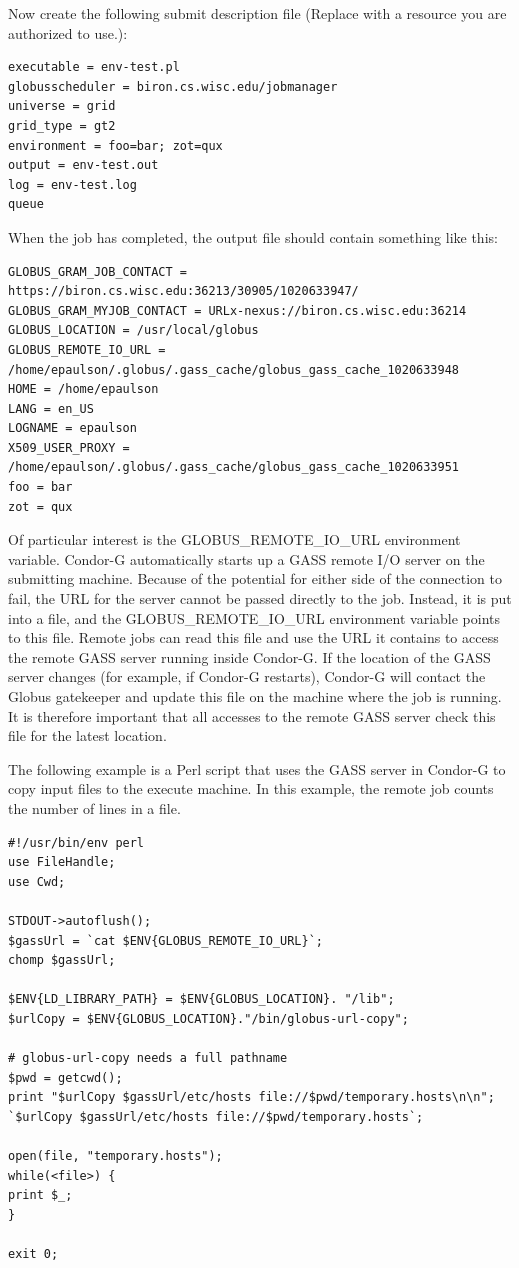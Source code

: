 Now create the following submit description file
(Replace  with a resource
you are authorized to use.):

\footnotesize
\begin{verbatim}
executable = env-test.pl
globusscheduler = biron.cs.wisc.edu/jobmanager
universe = grid
grid_type = gt2
environment = foo=bar; zot=qux
output = env-test.out
log = env-test.log
queue
\end{verbatim}
\normalsize

When the job has completed, the output file 
should contain something like this:

\footnotesize
\begin{verbatim}
GLOBUS_GRAM_JOB_CONTACT = https://biron.cs.wisc.edu:36213/30905/1020633947/
GLOBUS_GRAM_MYJOB_CONTACT = URLx-nexus://biron.cs.wisc.edu:36214
GLOBUS_LOCATION = /usr/local/globus
GLOBUS_REMOTE_IO_URL = /home/epaulson/.globus/.gass_cache/globus_gass_cache_1020633948
HOME = /home/epaulson
LANG = en_US
LOGNAME = epaulson
X509_USER_PROXY = /home/epaulson/.globus/.gass_cache/globus_gass_cache_1020633951
foo = bar
zot = qux
\end{verbatim}
\normalsize


Of particular interest is the GLOBUS\_REMOTE\_IO\_URL environment variable.
Condor-G automatically starts up a GASS remote I/O
server on the submitting machine.
Because of the potential for either side of the connection to fail,
the URL for the server cannot be passed directly to the job.
Instead, it is put into a file, and the GLOBUS\_REMOTE\_IO\_URL
environment variable points to this file. 
Remote jobs can read this file and use the URL it contains
to access the remote GASS server running inside Condor-G.
If the location
of the GASS server changes (for example, if Condor-G restarts),
Condor-G will contact the Globus gatekeeper and update this file on
the machine where the job is running.
It is therefore important that all accesses to
the remote GASS server check this file for the latest location.

The following example is a Perl script that uses the GASS server in Condor-G
to copy input files to the execute machine.
In this example, the remote job
counts the number of lines in a file.

\footnotesize
\begin{verbatim}
#!/usr/bin/env perl
use FileHandle;
use Cwd;

STDOUT->autoflush();
$gassUrl = `cat $ENV{GLOBUS_REMOTE_IO_URL}`;
chomp $gassUrl;

$ENV{LD_LIBRARY_PATH} = $ENV{GLOBUS_LOCATION}. "/lib";
$urlCopy = $ENV{GLOBUS_LOCATION}."/bin/globus-url-copy";

# globus-url-copy needs a full pathname
$pwd = getcwd();
print "$urlCopy $gassUrl/etc/hosts file://$pwd/temporary.hosts\n\n";
`$urlCopy $gassUrl/etc/hosts file://$pwd/temporary.hosts`;

open(file, "temporary.hosts");
while(<file>) {
print $_;
}

exit 0;
\end{verbatim}
\normalsize

